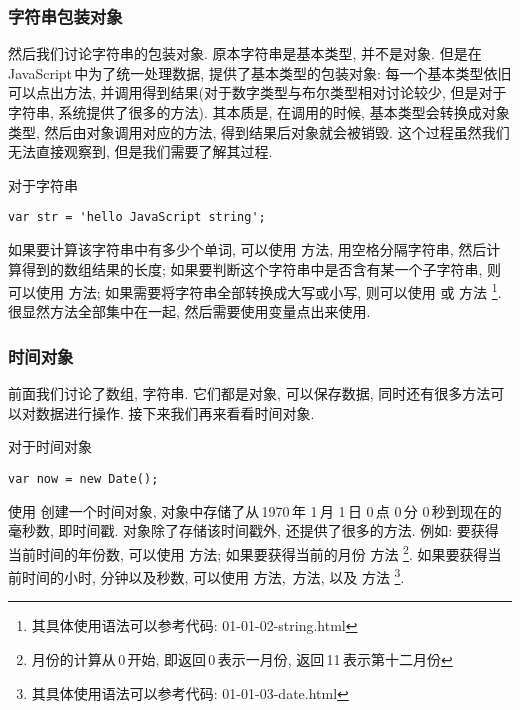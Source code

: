 \subsubsection{字符串包装对象}

然后我们讨论字符串的包装对象. 原本字符串是基本类型, 并不是对象. 但是在\,JavaScript\,中为了统一处理数据, 提供了基本类型的包装对象:
每一个基本类型依旧可以点出方法, 并调用得到结果(对于数字类型与布尔类型相对讨论较少, 但是对于字符串, 系统提供了很多的方法). 其本质是,
在调用的时候, 基本类型会转换成对象类型, 然后由对象调用对应的方法, 得到结果后对象就会被销毁. 这个过程虽然我们无法直接观察到, 
但是我们需要了解其过程.

对于字符串%
%
\begin{lstlisting}
var str = 'hello JavaScript string';
\end{lstlisting}%
%
如果要计算该字符串中有多少个单词, 可以使用\,\,方法, 用空格分隔字符串, 然后计算得到的数组结果的长度; 
如果要判断这个字符串中是否含有某一个子字符串, 则可以使用\,\,方法; 
如果需要将字符串全部转换成大写或小写, 则可以使用\,\,或\,\,方法%
%
\footnote{其具体使用语法可以参考代码: \textsf{01-01-02-string.html}}.
很显然方法全部集中在一起, 然后需要使用变量点出来使用.




\subsubsection{时间对象}

前面我们讨论了数组, 字符串. 它们都是对象, 可以保存数据, 同时还有很多方法可以对数据进行操作. 接下来我们再来看看时间对象.

对于时间对象%
%
\begin{lstlisting}
var now = new Date();
\end{lstlisting}%
%
使用\,\,创建一个时间对象, 
对象中存储了从\,1970\,年 1\,月 1\,日 0\,点 0\,分 0\,秒到现在的毫秒数,
即时间戳. 对象除了存储该时间戳外, 还提供了很多的方法. 
例如: 要获得当前时间的年份数, 可以使用\,\,方法;
如果要获得当前的月份\,\,方法%
%
\footnote{月份的计算从\,0\,开始, 即返回\,0\,表示一月份, 返回\,11\,表示第十二月份}.%
%
如果要获得当前时间的小时, 分钟以及秒数, 可以使用\,\,方法, \,方法,
以及\,\,方法%
%
\footnote{其具体使用语法可以参考代码: \textsf{01-01-03-date.html}}.






